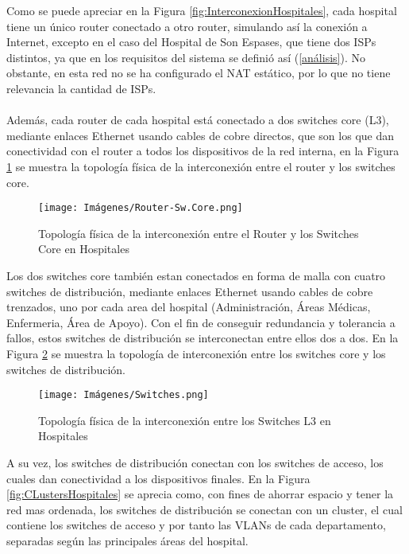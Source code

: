 Como se puede apreciar en la Figura \ref{fig:InterconexionHospitales}, cada hospital tiene un único router conectado a otro router, simulando así la conexión a Internet, excepto en el caso del Hospital de Son Espases, que 
tiene dos ISPs distintos, ya que en los requisitos del sistema se definió así (\ref{análisis}). No obstante, en esta red no se ha configurado el NAT estático, por lo que no tiene relevancia la cantidad de ISPs.
\\ \\
Además, cada router de cada hospital está conectado a dos switches core (L3), mediante enlaces Ethernet usando cables de cobre directos, que son los que dan conectividad con el router a todos los dispositivos de la red interna, en la Figura 
\ref{fig:InterconexionRouHospitales} se muestra la topología física de la interconexión entre el router y los switches core. 

\begin{figure}[H]
    \centering
    \texttt{[image: Imágenes/Router-Sw.Core.png]}
    \caption{Topología física de la interconexión entre el Router y los Switches Core en Hospitales}
    \label{fig:InterconexionRouHospitales}
\end{figure}

Los dos switches core también estan conectados en forma de malla con cuatro switches de distribución, mediante enlaces Ethernet usando cables de cobre trenzados, uno por cada area del hospital (Administración, Áreas Médicas, Enfermeria, Área de Apoyo). 
Con el fin de conseguir redundancia y tolerancia a fallos, estos switches de distribución se interconectan entre ellos dos a dos. En la Figura \ref{fig:InterconexionSwHospitales} se muestra la topología de interconexión entre los switches core y los switches de distribución.

\begin{figure}[H]
    \centering
    \texttt{[image: Imágenes/Switches.png]}
    \caption{Topología física de la interconexión entre los Switches L3 en Hospitales}
    \label{fig:InterconexionSwHospitales}
\end{figure}

A su vez, los switches de distribución conectan con los switches de acceso, los cuales dan conectividad a los dispositivos finales. En la Figura \ref{fig:CLustersHospitales} se aprecia como, con fines de 
ahorrar espacio y tener la red mas ordenada, los switches de distribución se conectan con un cluster, el cual contiene los switches de acceso y por tanto las VLANs de cada departamento, separadas 
según las principales áreas del hospital.

